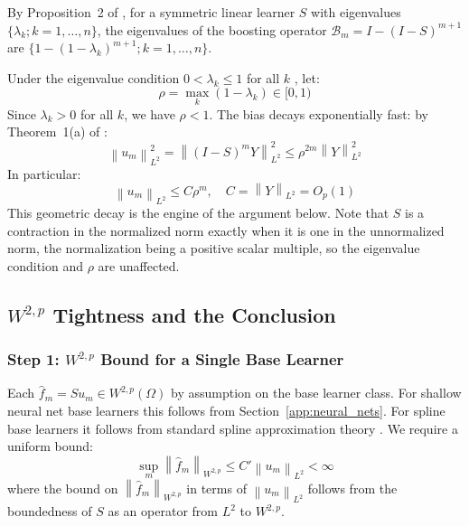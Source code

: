 \documentclass[12pt,a4paper]{article}
\numberwithin{equation}{section}
\theoremstyle{plain}
\theoremstyle{definition}
\newcommand{\norm}[1]{\left\| #1 \right\|}
\newcommand{\Wtwop}{W^{2,p}(\Omega)}
\begin{document}
	By Proposition~2 of \citet{buhlmann2003boosting}, for a symmetric linear learner $S$
	with eigenvalues $\{\lambda_k; k = 1,\ldots,n\}$, the eigenvalues of the boosting
	operator $\mathcal{B}_m = I - (I-S)^{m+1}$ are $\{1-(1-\lambda_k)^{m+1}; k =
	1,\ldots,n\}$.
	
	Under the eigenvalue condition $0 < \lambda_k \leq 1$ for all $k$
	\citep[Theorem~1]{buhlmann2003boosting}, let:
	\begin{equation}
		\rho = \max_k (1-\lambda_k) \in [0,1)
	\end{equation}
	Since $\lambda_k > 0$ for all $k$, we have $\rho < 1$. The bias decays
	exponentially fast: by Theorem~1(a) of \citet{buhlmann2003boosting}:
	\begin{equation}
		\norm{u_m}_{L^2}^2 = \norm{(I-S)^m Y}_{L^2}^2
		\leq \rho^{2m} \norm{Y}_{L^2}^2
	\end{equation}
	In particular:
	\begin{equation}
		\norm{u_m}_{L^2} \leq C\rho^m, \quad C = \norm{Y}_{L^2} = O_p(1)
		\label{eq:geometric_decay}
	\end{equation}
	This geometric decay is the engine of the argument below. Note that $S$ is a
	contraction in the normalized norm exactly when it is one in the
	unnormalized norm, the normalization being a positive scalar multiple, so
	the eigenvalue condition and $\rho$ are unaffected.
	
	
	\subsection{$W^{2,p}$ Tightness and the Conclusion}
	
	\subsubsection*{Step 1: $W^{2,p}$ Bound for a Single Base Learner}
	
	Each $\hat{f}_m = Su_m \in \Wtwop$ by assumption on the base learner class. For
	shallow neural net base learners this follows from Section~\ref{app:neural_nets}.
	For spline base learners it follows from standard spline approximation theory
	\citep{wahba1990splines}. We require a uniform bound:
	\begin{equation}
		\sup_m \norm{\hat{f}_m}_{W^{2,p}} \leq C' \norm{u_m}_{L^2} < \infty
	\end{equation}
	where the bound on $\norm{\hat{f}_m}_{W^{2,p}}$ in terms of $\norm{u_m}_{L^2}$
	follows from the boundedness of $S$ as an operator from $L^2$ to $W^{2,p}$.
	
\end{document}
